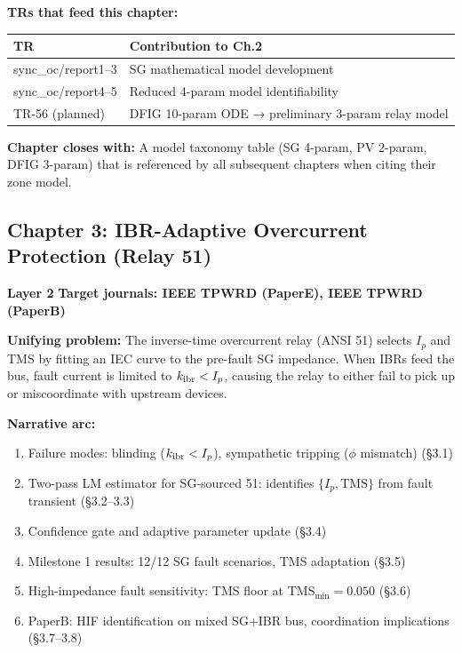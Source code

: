\documentclass[11pt, a4paper]{article}
\newcommand{\chtag}[2]{\colorbox{#1}{\color{white}\textbf{\small #2}}}
\begin{document}
\textbf{TRs that feed this chapter:}
\begin{center}
\begin{tabular}{ll}
\toprule
TR & Contribution to Ch.2 \\
\midrule
sync\_oc/report1--3 & SG mathematical model development \\
sync\_oc/report4--5 & Reduced 4-param model identifiability \\
TR-56 (planned) & DFIG 10-param ODE → preliminary 3-param relay model \\
\bottomrule
\end{tabular}
\end{center}

\textbf{Chapter closes with:} A model taxonomy table (SG 4-param, PV 2-param, DFIG 3-param)
that is referenced by all subsequent chapters when citing their zone model.

\subsection{Chapter 3: IBR-Adaptive Overcurrent Protection (Relay 51)}

\chtag{C2col}{Layer 2} \quad \textbf{Target journals: IEEE TPWRD (PaperE), IEEE TPWRD (PaperB)}

\textbf{Unifying problem:} The inverse-time overcurrent relay (ANSI 51) selects
$I_p$ and TMS by fitting an IEC curve to the pre-fault SG impedance.  When IBRs
feed the bus, fault current is limited to $k_{\rm ibr} < I_p$, causing the relay
to either fail to pick up or miscoordinate with upstream devices.

\textbf{Narrative arc:}
\begin{enumerate}[nosep]
  \item Failure modes: blinding ($k_{\rm ibr} < I_p$), sympathetic tripping ($\phi$ mismatch) (§3.1)
  \item Two-pass LM estimator for SG-sourced 51: identifies $\{I_p, \text{TMS}\}$ from fault transient (§3.2--3.3)
  \item Confidence gate and adaptive parameter update (§3.4)
  \item Milestone 1 results: 12/12 SG fault scenarios, TMS adaptation (§3.5)
  \item High-impedance fault sensitivity: TMS floor at $\text{TMS}_{\min}=0.050$ (§3.6)
  \item PaperB: HIF identification on mixed SG+IBR bus, coordination implications (§3.7--3.8)
\end{enumerate}
\end{document}
